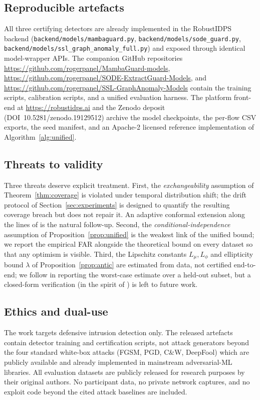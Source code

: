\documentclass[journal,twoside]{IEEEtran}
\begin{document}
\subsection{Reproducible artefacts}
All three certifying detectors are already implemented in the
RobustIDPS backend
(\texttt{backend/models/mambaguard.py},
\texttt{backend/models/sode\_guard.py},
\texttt{backend/models/ssl\_graph\_anomaly\_full.py}) and exposed
through identical model-wrapper APIs. The companion GitHub repositories
\url{https://github.com/rogerpanel/MambaGuard-models},
\url{https://github.com/rogerpanel/SODE-ExtractGuard-Models}, and
\url{https://github.com/rogerpanel/SSL-GraphAnomaly-Models} contain the
training scripts, calibration scripts, and a unified evaluation
harness. The platform front-end at \url{https://robustidps.ai} and the
Zenodo deposit (DOI~10.5281/zenodo.19129512) archive the model
checkpoints, the per-flow CSV exports, the seed manifest, and an
Apache-2 licensed reference implementation of Algorithm~\ref{alg:unified}.

\subsection{Threats to validity}
Three threats deserve explicit treatment.
First, the \emph{exchangeability} assumption of
Theorem~\ref{thm:coverage} is violated under temporal distribution
shift; the drift protocol of Section~\ref{sec:experiments} is designed
to quantify the resulting coverage breach but does not repair it. An
adaptive conformal extension along the lines of
\cite{gibbs2021adaptive,xu2024conformaloos} is the natural follow-up.
Second, the \emph{conditional-independence} assumption of
Proposition~\ref{prop:unified} is the weakest link of the unified
bound; we report the empirical FAR alongside the theoretical bound on
every dataset so that any optimism is visible. Third, the Lipschitz
constants $L_\mu, L_\phi$ and ellipticity bound $\lambda$
of Proposition~\ref{prop:antic} are estimated from data, not certified
end-to-end; we follow \cite{chen2024sdeguard} in reporting the
worst-case estimate over a held-out subset, but a closed-form
verification (in the spirit of \cite{wong2018convex,gowal2019ibp}) is
left to future work.

\subsection{Ethics and dual-use}
The work targets defensive intrusion detection only. The released
artefacts contain detector training and certification scripts, not
attack generators beyond the four standard white-box attacks (FGSM,
PGD, C\&W, DeepFool) which are publicly available and already
implemented in mainstream adversarial-ML libraries. All evaluation
datasets are publicly released for research purposes by their original
authors. No participant data, no private network captures, and no
exploit code beyond the cited attack baselines are included.
\end{document}
